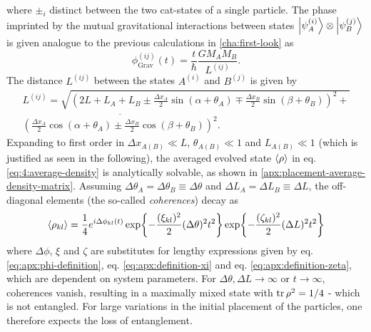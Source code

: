 where $\pm_i$ distinct between the two cat-states of a single particle.
The phase imprinted by the mutual gravitational interactions between states $\ket{\psi^{(i)}_A}\otimes\ket{\psi^{(j)}_B}$ is given analogue to the previous calculations in \cref{cha:first-look} as
\begin{equation}\label{eq:4:phi-grav}
  \phi^{(ij)}_\mathrm{Grav}(t) = \frac{t}{\hbar} \frac{G M_A M_B}{L^{(ij)}} .
\end{equation}
The distance $L^{(ij)}$ between the states $A^{(i)}$ and $B^{(j)}$ is given by
\begin{multline}\label{eq:4:L-gravity}
  L^{(ij)} = \sqrt{\left(2L + L_A + L_B \pm \frac{\Delta x_A}{2}\sin(\alpha + \theta_A) \mp \frac{\Delta x_B}{2}\sin(\beta + \theta_B)\right)^2 +} \\ \overline{\left(\frac{\Delta x_A}{2}\cos(\alpha + \theta_A) \pm \frac{\Delta x_B}{2}\cos(\beta + \theta_B)\right)^2} .
\end{multline}
Expanding to first order in $\Delta x_{A(B)} \ll L$, $\theta_{A(B)} \ll 1$ and $L_{A(B)} \ll 1$ (which is justified as seen in the following), the averaged evolved state 
$\left\langle\rho\right\rangle$ in eq. \eqref{eq:4:average-density} is analytically solvable, as shown in \cref{apx:placement-average-density-matrix}.
Assuming $\Delta \theta_A = \Delta \theta_B \equiv \Delta\theta$ and $\Delta L_A = \Delta L_B \equiv \Delta L$, the off-diagonal elements (the so-called \textit{coherences}) decay as
\begin{equation}\label{eq:4:average-density-element}
  \left\langle\rho_{kl}\right\rangle = \frac{1}{4} e^{i \Delta \phi_{kl}(t)} \exp{-\frac{(\xi_{kl})^2}{2} (\Delta\theta)^2 t^2} \exp{-\frac{(\zeta_{kl})^2}{2} (\Delta L)^2 t^2}
\end{equation}
where $\Delta \phi$, $\xi$ and $\zeta$ are substitutes for lengthy expressions given by eq. \eqref{eq:apx:phi-definition}, eq. \eqref{eq:apx:definition-xi} and eq. \eqref{eq:apx:definition-zeta}, which are dependent on system parameters.
For $\Delta \theta, \Delta L \rightarrow \infty$ or $t\rightarrow \infty$, coherences vanish, resulting in a maximally mixed state with $\tr\rho^2 = 1/4$ - which is not entangled.
For large variations in the initial placement of the particles, one therefore expects the loss of entanglement.

